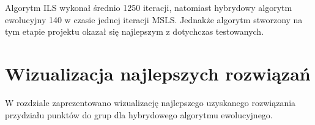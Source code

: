 \documentclass[main.tex]{subfiles}
\begin{document}
\begin{table}[H]
\centering
\caption{Wyniki eksperymentów obliczeniowych}
\label{table:wyniki}
\end{table}
Algorytm ILS wykonał średnio 1250 iteracji, natomiast hybrydowy algorytm ewolucyjny 140 w czasie jednej iteracji MSLS.
Jednakże algorytm stworzony na tym etapie projektu okazał się najlepszym z dotychczas testowanych.


\section{Wizualizacja najlepszych rozwiązań}
W rozdziale zaprezentowano wizualizację najlepszego uzyskanego rozwiązania przydziału punktów do grup dla hybrydowego algorytmu ewolucyjnego.
\end{document}

